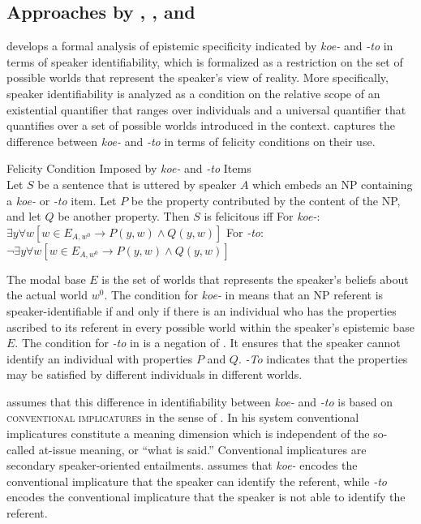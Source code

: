 \documentclass[output=paper,colorlinks,citecolor=brown]{langscibook}
\begin{document}
\subsection{Approaches by \citet{Kagan2011}, \citet{Gorishneva.Zimmermann2011}, and \citet{Yanovich2005}}\label{geist:sec:kagan-gorish-yanov}

\citet{Kagan2011} develops a formal analysis of epistemic specificity indicated by \textit{koe-} and \textit{-to} in terms of speaker identifiability, which is formalized as a restriction on the set of possible worlds that represent the speaker’s view of reality. More specifically, speaker identifiability is analyzed as a condition on the relative scope of an existential quantifier that ranges over individuals and a universal quantifier that quantifies over a set of possible worlds introduced in the context. \citeauthor{Kagan2011} captures the difference between \textit{koe-} and \textit{-to} in terms of felicity conditions on their use.  

\eanoraggedright Felicity Condition Imposed by \textit{koe-} and \textit{-to} Items \citep[71, 74]{Kagan2011}\smallskip\label{geist:ex:kagan}\\
 Let $S$ be a sentence that is uttered by speaker $A$ which embeds an NP containing a \textit{koe-} or \textit{-to} item. Let $P$ be the property contributed by the content of the NP, and let $Q$ be another property. Then $S$ is felicitous iff
 \ea For \textit{koe-}:\label{geist:ex:kagan-a}\\
$\exists y\forall w[w\in E_{A,w^0}\rightarrow P(y,w)\wedge Q(y,w)]$
\ex For \textit{-to}:\label{geist:ex:kagan-b}\\
$\neg\exists y\forall w[w\in E_{A,w^0}\rightarrow P(y,w)\wedge Q(y,w)]$
\z\z

\noindent The modal base $E$ is the set of worlds that represents the speaker’s beliefs about the actual world $w^0$. The condition for \textit{koe-} in  means that an NP referent is speaker-identifiable if and only if there is an individual who has the properties ascribed to its referent in every possible world within the speaker’s epistemic base $E$. The condition for \textit{-to} in  is a negation of . It ensures that the speaker cannot identify an individual with properties $P$ and $Q$. \textit{-To} indicates that the properties may be satisfied by different individuals in different worlds.

\citet{Kagan2011} assumes that this difference in identifiability between \textit{koe-} and \textit{-to} is based on \textsc{conventional implicatures} in the sense of \citet{Potts2007}. In his system conventional implicatures constitute a meaning dimension which is independent of the so-called at-issue meaning, or “what is said.” Conventional implicatures are secondary speaker-oriented entailments. \citet{Kagan2011} assumes that \textit{koe-} encodes the conventional implicature that the speaker can identify the referent, while \textit{-to} encodes the conventional implicature that the speaker is not able to identify the referent.
\end{document}
